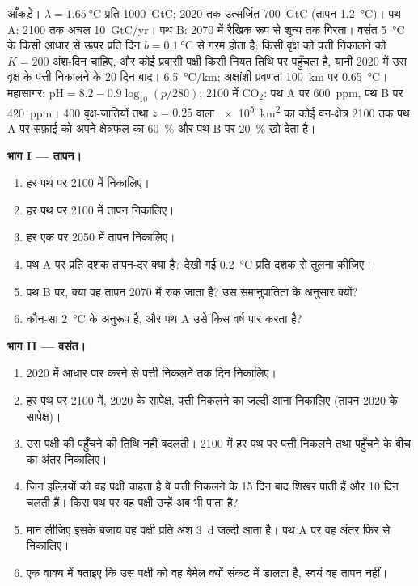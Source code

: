 \begin{problem}
\label{pb:b2:global-change:1}
आँकड़े। $\lambda = \qty{1.65}{\celsius}$ प्रति \qty{1000}{GtC};
2020 तक उत्सर्जित \qty{700}{GtC} (तापन \qty{1.2}{\celsius})। पथ
A: 2100 तक अचल \qty{10}{GtC/yr}। पथ B: 2070 में रैखिक रूप से
शून्य तक गिरता। वसंत \qty{5}{\celsius} के किसी आधार से ऊपर प्रति दिन
$b = \qty{0.1}{\celsius}$ से गरम होता है; किसी वृक्ष को पत्ती निकालने को $K = 200$
अंश-दिन चाहिए, और कोई प्रवासी पक्षी किसी नियत तिथि पर पहुँचता है,
यानी 2020 में उस वृक्ष के पत्ती निकालने के 20 दिन बाद। 
\qty{6.5}{\celsius/km}; अक्षांशी प्रवणता \qty{100}{km} पर
\qty{0.65}{\celsius}। महासागर: $\mathrm{pH} = 8.2 - 0.9\log_{10}(p/280)$;
2100 में \ensuremath{\mathrm{CO_2}}: पथ A पर \qty{600}{ppm}, पथ B पर \qty{420}{ppm}।
400 वृक्ष-जातियों तथा $z = 0.25$ वाला \qty{e5}{km^2} का कोई वन-क्षेत्र
2100 तक पथ A पर सफ़ाई को अपने क्षेत्रफल का \qty{60}{\%} और
पथ B पर \qty{20}{\%} खो देता है।

\medskip
\noindent\textbf{भाग I --- तापन।}
\begin{enumerate}
  \item हर पथ पर 2100 में  निकालिए।
  \item हर पथ पर 2100 में तापन निकालिए।
  \item हर एक पर 2050 में तापन निकालिए।
  \item पथ A पर प्रति दशक तापन-दर क्या है? देखी गई
        \qty{0.2}{\celsius} प्रति दशक से तुलना कीजिए।
  \item पथ B पर, क्या वह तापन 2070 में रुक जाता है? उस
        समानुपातिता के अनुसार क्यों?
  \item कौन-सा  \qty{2}{\celsius} के अनुरूप है,
        और पथ A उसे किस वर्ष पार करता है?
\end{enumerate}

\medskip
\noindent\textbf{भाग II --- वसंत।}
\begin{enumerate}[resume]
  \item 2020 में आधार पार करने से पत्ती निकलने तक दिन निकालिए।
  \item हर पथ पर 2100 में, 2020 के सापेक्ष, पत्ती निकलने का जल्दी आना
        निकालिए (तापन 2020 के सापेक्ष)।
  \item उस पक्षी की पहुँचने की तिथि नहीं बदलती। 2100 में हर पथ पर
        पत्ती निकलने तथा पहुँचने के बीच का अंतर निकालिए।
  \item जिन इल्लियों को वह पक्षी चाहता है वे पत्ती निकलने के 15 दिन बाद शिखर पाती हैं
        और 10 दिन चलती हैं। किस पथ पर वह पक्षी उन्हें अब भी पाता है?
  \item मान लीजिए इसके बजाय वह पक्षी प्रति अंश \qty{3}{d} जल्दी आता
        है। पथ A पर वह अंतर फिर से निकालिए।
  \item एक वाक्य में बताइए कि उस पक्षी को वह बेमेल क्यों संकट में डालता है, स्वयं वह तापन नहीं।
\end{enumerate}


\end{problem}
